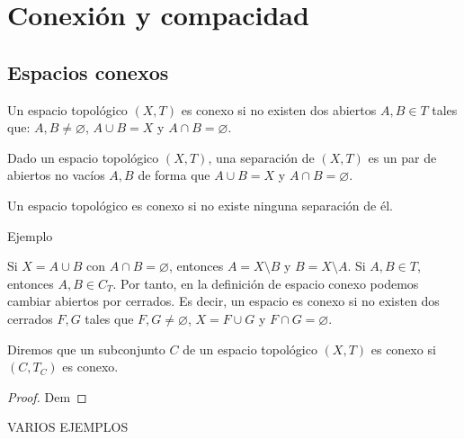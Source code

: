 \newpage
\section{Conexión y compacidad}

\subsection{Espacios conexos}
\begin{ndef}
  Un espacio topológico $(X,T)$ es conexo si no existen dos abiertos $A,B \in T$ tales que: $A,B \neq \varnothing$, $A \cup B = X$ y $A \cap B = \varnothing$.

\end{ndef}

\begin{ndef}[Separación]
    Dado un espacio topológico $(X,T)$, una separación de $(X,T)$ es un par de abiertos no vacíos $A,B$ de forma que $A \cup B = X$ y $A \cap B = \varnothing$.
\end{ndef}
\begin{obs}
    Un espacio topológico es conexo si no existe ninguna separación de él.
\end{obs}
\begin{exmp}
    Ejemplo
\end{exmp}

\begin{note}
    Si $X = A \cup B$ con $A \cap B = \varnothing$, entonces $A = X \setminus B$ y $B = X \setminus A$. Si $A,B \in T$, entonces $A,B \in C_T$. Por tanto, en la definición de espacio conexo podemos cambiar abiertos por cerrados. Es decir, un espacio es conexo si no existen dos cerrados $F,G$ tales que $F,G \neq \varnothing$, $X = F \cup G$ y $F \cap G = \varnothing$.
\end{note}

\begin{ndef}
    Diremos que un subconjunto $C$ de un espacio topológico $(X,T)$ es conexo si $(C,T_C)$ es conexo.
\end{ndef}
\begin{proof}
    Dem
\end{proof}

VARIOS EJEMPLOS

